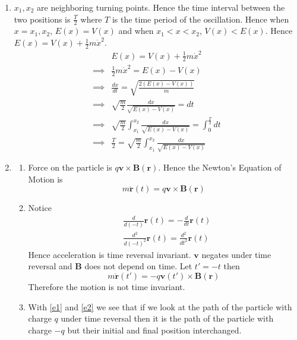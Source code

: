 \documentclass{article}
\newcommand{\bmr}{\boldsymbol{r}}
\newcommand{\bmv}{\boldsymbol{v}}
\newcommand{\bmB}{\boldsymbol{B}}
\begin{document}
\begin{enumerate}
	
	
	\item $x_1,x_2$ are neighboring turning points. Hence the time interval between the two positions is $\frac{T}{2}$ where $T$ is the time period of the oscillation. Hence when $x=x_1, x_2$, $E(x)=V(x)$ and when $x_1<x<x_2$, $V(x)<E(x)$. Hence $E(x)=V(x)+\frac12m\dot{x}^2$. \begin{align*}
	& E(x)=V(x)+\frac12m\dot{x}^2\\
	\implies & \frac12m\dot{x}^2=E(x)-V(x)\\
	\implies & \frac{dx}{dt}=\sqrt{\frac{2(E(x)-V(x))}{m}}\\
	\implies & \sqrt{\frac{m}{2}}\frac{dx}{\sqrt{E(x)-V(x)}}=dt\\
	\implies & \sqrt{\frac{m}{2}}\int_{x_1}^{x_2}\frac{dx}{\sqrt{E(x)-V(x)}}=\int_0^{\frac{T}{2}}dt\\
	\implies & \frac{T}{2}= \sqrt{\frac{m}{2}}\int_{x_1}^{x_2}\frac{dx}{\sqrt{E(x)-V(x)}}
\end{align*}


\item \begin{enumerate}
	\item Force on the particle is $q\bmv\times\bmB(\bmr)$. Hence the Newton's Equation of Motion is \begin{equation}
		m\ddot{\bmr}(t)=q\bmv\times\bmB(\bmr)\label{e1}
	\end{equation}
	\item Notice\begin{align*}
		&\frac{d}{d(-t)}\bmr(t)=-\frac{d}{dt}\bmr(t)\\
		& \frac{d^2}{d(-t)^2}\bmr(t)=\frac{d^2}{dt^2}\bmr(t)
	\end{align*}Hence acceleration is time reversal invariant. $\bmv$ negates under time reversal and $\bmB$ does not depend on time. Let $t'=-t$ then \begin{equation}
	m\ddot{\bmr}(t')=-q\bmv(t')\times\bmB(\bmr)\label{e2}
\end{equation}Therefore the motion is not time invariant.
\item With \eqref{e1} and \eqref{e2} we see that if we look at the path of the particle with charge $q$ under time reversal then it is the path of the particle with charge $-q$ but their initial and final position interchanged.
\end{enumerate}
	\end{enumerate}
\end{document}
